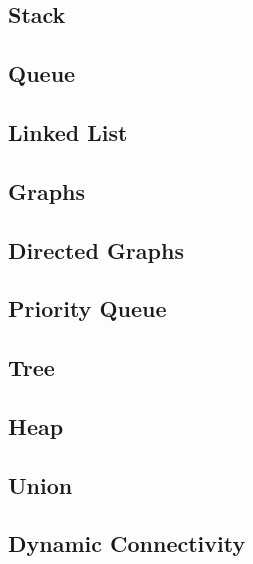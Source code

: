 \subsection{Stack}

\newpage

\subsection{Queue}

\newpage

\subsection{Linked List}

\newpage

\subsection{Graphs}

\newpage

\subsection{Directed Graphs}

\newpage

\subsection{Priority Queue}

\newpage

\subsection{Tree}

\newpage

\subsection{Heap}

\newpage

\subsection{Union}

\newpage

\subsection{Dynamic Connectivity}

\newpage

